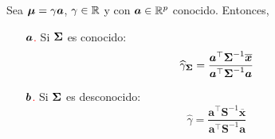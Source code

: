 Sea $\bf{\mu} = \gamma \bf{a}$, $\gamma\enr$ y con $\bf{a} \in \R{p}$ conocido. Entonces,
\begin{itemize}
\item[\textcolor{red}{$\bf{a}$.}] Si $\bf{\Sigma}$ es conocido:
$$
\widehat{\gamma}_{\bf{\Sigma}}=\frac{\boldsymbol{a}^{\top} \boldsymbol{\Sigma}^{-1} \overline{\boldsymbol{x}}}{\boldsymbol{a}^{\top} \boldsymbol{\Sigma}^{-1} \boldsymbol{a}}
$$
\item[\textcolor{red}{$\bf{b}$.}] Si $\bf{\Sigma}$ es desconocido:
$$
\widehat{\gamma}=\frac{\boldsymbol{a}^{\top} \boldsymbol{S}^{-1} \overline{\boldsymbol{x}}}{\boldsymbol{a}^{\top} \boldsymbol{S}^{-1} \boldsymbol{a}}
$$
\end{itemize}